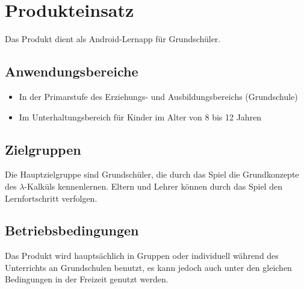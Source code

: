 \section{Produkteinsatz}

	Das Produkt dient als Android-Lernapp für Grundschüler.
	
\subsection{Anwendungsbereiche}
\begin{itemize}
	\item In der Primarstufe des Erziehungs- und Ausbildungsbereichs (Grundschule)
	\item Im Unterhaltungsbereich für Kinder im Alter von 8 bis 12 Jahren
\end{itemize}

\subsection{Zielgruppen}
	Die Hauptzielgruppe sind Grundschüler, die durch das Spiel die Grundkonzepte des $\lambda$-Kalküls kennenlernen. Eltern und Lehrer können durch das Spiel den Lernfortschritt verfolgen.

\subsection{Betriebsbedingungen}
	Das Produkt wird hauptsächlich in Gruppen oder individuell während des Unterrichts an Grundschulen benutzt, es kann jedoch auch unter den gleichen Bedingungen in der Freizeit genutzt werden.